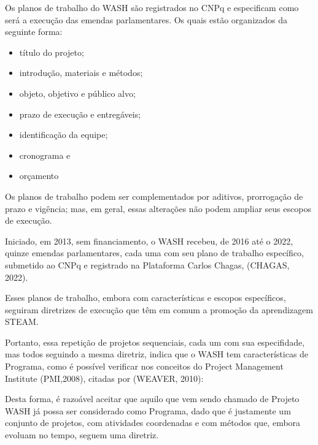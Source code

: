 Os planos de trabalho do WASH são registrados no CNPq e especificam como será a execução das emendas parlamentares. Os quais estão organizados da seguinte forma:


\begin{itemize}
\item título do projeto;
\item introdução, materiais e métodos;
\item objeto, objetivo e público alvo;
\item prazo de execução e entregáveis;
\item identificação da equipe;
\item cronograma e
\item orçamento

\end{itemize}

Os planos de trabalho podem ser complementados por aditivos, prorrogação de prazo e vigência; mas, em geral, essas alterações não podem ampliar seus escopos de execução.

Iniciado, em 2013, sem financiamento, o WASH recebeu, de 2016 até o 2022, quinze emendas parlamentares, cada uma com seu plano de trabalho específico, submetido ao CNPq e registrado na Plataforma Carlos Chagas, (CHAGAS, 2022).

Esses planos de trabalho, embora com características e escopos específicos, seguiram diretrizes de execução que têm em comum a promoção da aprendizagem STEAM.

Portanto, essa repetição de projetos sequenciais, cada um com sua especifidade, mas todos seguindo a mesma diretriz, indica que o WASH tem características de Programa, como é possível verificar nos conceitos do Project Management Institute  (PMI,2008), citadas por  (WEAVER, 2010):


\noindent\begin{center}\mbox{\centering{}}\end{center}


Desta forma, é razoável aceitar que aquilo que vem sendo chamado de Projeto WASH já possa ser considerado como Programa, dado que é justamente um conjunto de projetos, com atividades coordenadas e com métodos que, embora evoluam no tempo, seguem uma diretriz.

